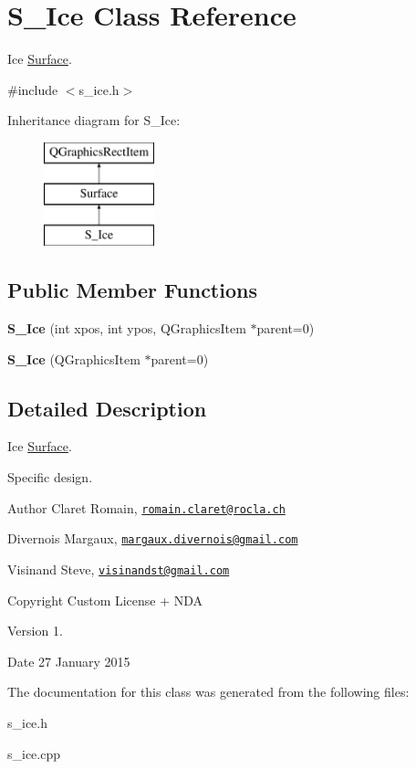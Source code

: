 \hypertarget{class_s___ice}{}\section{S\+\_\+\+Ice Class Reference}
\label{class_s___ice}


Ice \hyperlink{class_surface}{Surface}.  




{\ttfamily \#include $<$s\+\_\+ice.\+h$>$}

Inheritance diagram for S\+\_\+\+Ice\+:\begin{figure}[H]
\begin{center}
\leavevmode
\includegraphics[height=3.000000cm]{class_s___ice}
\end{center}
\end{figure}
\subsection*{Public Member Functions}
\begin{DoxyCompactItemize}
\item 
\hypertarget{class_s___ice_a3a1fdb0204964dfee672629d22cd0e76}{}{\bfseries S\+\_\+\+Ice} (int xpos, int ypos, Q\+Graphics\+Item $\ast$parent=0)\label{class_s___ice_a3a1fdb0204964dfee672629d22cd0e76}

\item 
\hypertarget{class_s___ice_a17b24abf85ec0bd466971675b657f856}{}{\bfseries S\+\_\+\+Ice} (Q\+Graphics\+Item $\ast$parent=0)\label{class_s___ice_a17b24abf85ec0bd466971675b657f856}

\end{DoxyCompactItemize}


\subsection{Detailed Description}
Ice \hyperlink{class_surface}{Surface}. 

Specific design. \begin{DoxyAuthor}{Author}
Claret Romain, \href{mailto:romain.claret@rocla.ch}{\tt romain.\+claret@rocla.\+ch} 

Divernois Margaux, \href{mailto:margaux.divernois@gmail.com}{\tt margaux.\+divernois@gmail.\+com} 

Visinand Steve, \href{mailto:visinandst@gmail.com}{\tt visinandst@gmail.\+com} 
\end{DoxyAuthor}
\begin{DoxyCopyright}{Copyright}
Custom License + N\+D\+A 
\end{DoxyCopyright}
\begin{DoxyVersion}{Version}
1. 
\end{DoxyVersion}
\begin{DoxyDate}{Date}
27 January 2015 
\end{DoxyDate}


The documentation for this class was generated from the following files\+:\begin{DoxyCompactItemize}
\item 
s\+\_\+ice.\+h\item 
s\+\_\+ice.\+cpp\end{DoxyCompactItemize}
